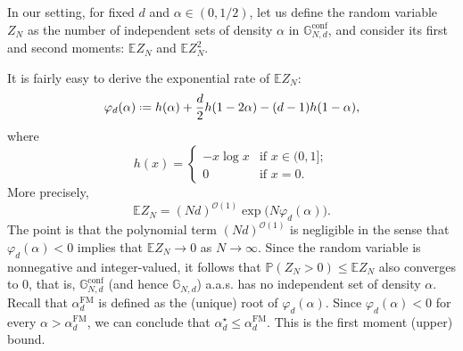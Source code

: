 \documentclass[12pt]{amsart}
\theoremstyle{definition}
\newcommand\Eb{\mathbb{E}}  %
\newcommand\Pb{\mathbb{P}}  %
\newcommand\Gb{\mathbb{G}}
\newcommand\Gbconf{\mathbb{G}^{\textrm{conf}}}
\newcommand\Oc{\mathcal{O}}  %
\newcommand\al{\alpha}
\newcommand\alstar{\alpha^{\star}}
\newcommand\alfm{\alpha^{\mathrm{FM}}}
\newcommand{\defeq}{\mathrel{\vcenter{\baselineskip0.5ex \lineskiplimit0pt
                     \hbox{\scriptsize.}\hbox{\scriptsize.}}}%
                     =}
\begin{document}
In our setting, for fixed $d$ and $\al \in (0,1/2)$, let us define the random variable $Z_N$ as the number of independent sets of density $\al$ in $\Gbconf_{N,d}$, and consider its first and second moments: $\Eb Z_N$ and $\Eb Z_N^2$.

It is fairly easy to derive the exponential rate of $\Eb Z_N$: 
%
\begin{equation} \label{eq:phi}
\varphi_d(\al) \defeq 
h(\al) + \frac{d}{2} h(1-2\al) - (d-1) h(1-\al) , 
\end{equation}
%
where 
%
\[ h(x) = 
\begin{cases}
-x \log x & \text{if } x \in (0,1];\\
0 & \text{if } x=0 .
\end{cases} \]
%
More precisely, 
%
\[ \Eb Z_N = (Nd)^{\Oc(1)} 
\exp\big( N \varphi_d(\al) \big) . \]
%
The point is that the polynomial term $(Nd)^{\Oc(1)}$ is negligible in the sense that $\varphi_d(\al)<0$ implies that $\Eb Z_N \to 0$ as $N \to \infty$. Since the random variable is nonnegative and integer-valued, it follows that $\Pb( Z_N > 0 ) \leq \Eb Z_N$ also converges to $0$, that is, $\Gbconf_{N,d}$ (and hence $\Gb_{N,d}$) a.a.s. has no independent set of density $\al$. Recall that $\alfm_d$ is defined as the (unique) root of $\varphi_d(\al)$. Since $\varphi_d(\al)<0$ for every $\al>\alfm_d$, we can conclude that $\alstar_d \leq \alfm_d$. This is the first moment (upper) bound.
\end{document}
